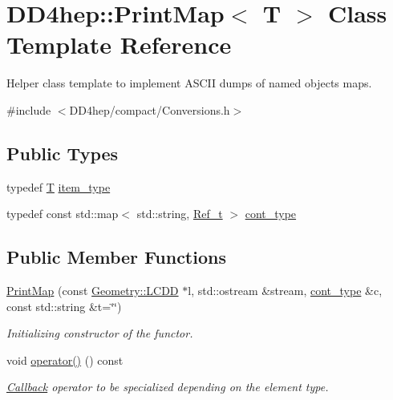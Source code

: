 \hypertarget{struct_d_d4hep_1_1_print_map}{}\section{D\+D4hep\+:\+:Print\+Map$<$ T $>$ Class Template Reference}
\label{struct_d_d4hep_1_1_print_map}


Helper class template to implement A\+S\+C\+II dumps of named objects maps.  




{\ttfamily \#include $<$D\+D4hep/compact/\+Conversions.\+h$>$}

\subsection*{Public Types}
\begin{DoxyCompactItemize}
\item 
typedef \hyperlink{class_t}{T} \hyperlink{struct_d_d4hep_1_1_print_map_a8d784c171bb184d181296a306cd1301d}{item\+\_\+type}
\item 
typedef const std\+::map$<$ std\+::string, \hyperlink{group___d_d4_h_e_p___g_e_o_m_e_t_r_y_ga40af83be6718bb8828a3d83dc7f8c930}{Ref\+\_\+t} $>$ \hyperlink{struct_d_d4hep_1_1_print_map_a75356a94ee86763170e76a2096ec4cb5}{cont\+\_\+type}
\end{DoxyCompactItemize}
\subsection*{Public Member Functions}
\begin{DoxyCompactItemize}
\item 
\hyperlink{struct_d_d4hep_1_1_print_map_a5e9d6107e83c34022dd352fc04cf346a}{Print\+Map} (const \hyperlink{class_d_d4hep_1_1_geometry_1_1_l_c_d_d}{Geometry\+::\+L\+C\+DD} $\ast$l, std\+::ostream \&stream, \hyperlink{struct_d_d4hep_1_1_print_map_a75356a94ee86763170e76a2096ec4cb5}{cont\+\_\+type} \&c, const std\+::string \&t=\char`\"{}\char`\"{})
\begin{DoxyCompactList}\small\item\em Initializing constructor of the functor. \end{DoxyCompactList}\item 
void \hyperlink{struct_d_d4hep_1_1_print_map_a9a0ce25cdb005c64f747c52f249ab884}{operator()} () const
\begin{DoxyCompactList}\small\item\em \hyperlink{class_d_d4hep_1_1_callback}{Callback} operator to be specialized depending on the element type. \end{DoxyCompactList}\end{DoxyCompactItemize}
